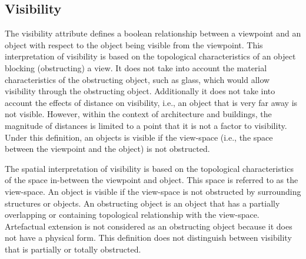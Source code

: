 \documentclass[12pt]{ucthesis}
\begin{document}
\subsection{Visibility}
The visibility attribute defines a boolean relationship between a viewpoint and an object with respect to the object being visible from the viewpoint. This interpretation of visibility is based on the topological characteristics of an object blocking (obstructing) a view. It does not take into account the material characteristics of the obstructing object, such as glass, which would allow visibility through the obstructing object. Additionally it does not take into account the effects of distance on visibility, i.e., an object that is very far away is not visible. However, within the context of architecture and buildings, the magnitude of distances is limited to a point that it is not a factor to visibility. Under this definition, an objects is visible if the view-space (i.e., the space between the viewpoint and the object) is not obstructed.

The spatial interpretation of visibility is based on the topological characteristics of the space in-between the viewpoint and object. This space is referred to as the view-space. An object is visible if the view-space is not obstructed by surrounding structures or objects. An obstructing object is an object that has a partially overlapping or containing topological relationship with the view-space. Artefactual extension is not considered as an obstructing object because it does not have a physical form. This definition does not distinguish between visibility that is partially or totally obstructed.
\end{document}

